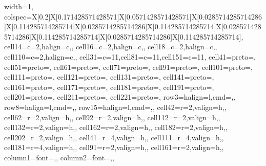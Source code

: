 \documentclass[
  letterpaper,
  DIV=11,
  numbers=noendperiod]{scrartcl}
\makeatletter
\renewenvironment{table}%
   {\renewcommand\familydefault\sfdefault
    \@float{table}}
   {\end@float}
\makeatother
\begin{document}
\begin{table}
{\centering
\begin{talltblr}[         %
entry=none,label=none,
note{}={Note: Est. = Estimate, CI = 95 percent confidence interval, GM = Geometric Mean},
]                     %
{                     %
width={1\linewidth},
colspec={X[0.2]X[0.171428571428571]X[0.0571428571428571]X[0.0285714285714286]X[0.114285714285714]X[0.0285714285714286]X[0.114285714285714]X[0.0285714285714286]X[0.114285714285714]X[0.0285714285714286]X[0.114285714285714]},
cell{1}{4}={c=2,}{halign=c,},
cell{1}{6}={c=2,}{halign=c,},
cell{1}{8}={c=2,}{halign=c,},
cell{1}{10}={c=2,}{halign=c,},
cell{3}{1}={c=11}{},cell{8}{1}={c=11}{},cell{15}{1}={c=11}{},
cell{4}{1}={preto={\hspace{1em}}},
cell{5}{1}={preto={\hspace{1em}}},
cell{6}{1}={preto={\hspace{1em}}},
cell{7}{1}={preto={\hspace{1em}}},
cell{9}{1}={preto={\hspace{1em}}},
cell{10}{1}={preto={\hspace{1em}}},
cell{11}{1}={preto={\hspace{1em}}},
cell{12}{1}={preto={\hspace{1em}}},
cell{13}{1}={preto={\hspace{1em}}},
cell{14}{1}={preto={\hspace{1em}}},
cell{16}{1}={preto={\hspace{1em}}},
cell{17}{1}={preto={\hspace{1em}}},
cell{18}{1}={preto={\hspace{1em}}},
cell{19}{1}={preto={\hspace{1em}}},
cell{20}{1}={preto={\hspace{1em}}},
cell{21}{1}={preto={\hspace{1em}}},
cell{22}{1}={preto={\hspace{1em}}},
row{3}={halign=l,cmd=\bfseries,},
row{8}={halign=l,cmd=\bfseries,},
row{15}={halign=l,cmd=\bfseries,},
cell{4}{2}={r=2,}{valign=h,},
cell{6}{2}={r=2,}{valign=h,},
cell{9}{2}={r=2,}{valign=h,},
cell{11}{2}={r=2,}{valign=h,},
cell{13}{2}={r=2,}{valign=h,},
cell{16}{2}={r=2,}{valign=h,},
cell{18}{2}={r=2,}{valign=h,},
cell{20}{2}={r=2,}{valign=h,},
cell{4}{1}={r=4,}{valign=h,},
cell{11}{1}={r=4,}{valign=h,},
cell{18}{1}={r=4,}{valign=h,},
cell{9}{1}={r=2,}{valign=h,},
cell{16}{1}={r=2,}{valign=h,},
column{1}={font=\fontsize{0.8em}{1.1em}\selectfont,},
column{2}={font=\fontsize{0.8em}{1.1em}\selectfont,},
}
\end{talltblr}}
\end{table}
\end{document}
